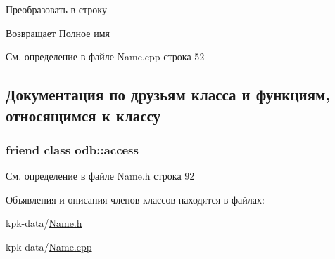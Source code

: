 Преобразовать в строку 

\begin{DoxyReturn}{Возвращает}
Полное имя 
\end{DoxyReturn}


См. определение в файле Name.\+cpp строка 52



\subsection{Документация по друзьям класса и функциям, относящимся к классу}
\subsubsection[{\texorpdfstring{odb\+::access}{odb::access}}]{\setlength{\rightskip}{0pt plus 5cm}friend class odb\+::access\hspace{0.3cm}{\ttfamily [friend]}}\hypertarget{classkpk_1_1data_1_1_name_acb4d953abf85ae525f1d06a0c3a86a55}{}\label{classkpk_1_1data_1_1_name_acb4d953abf85ae525f1d06a0c3a86a55}


См. определение в файле Name.\+h строка 92



Объявления и описания членов классов находятся в файлах\+:\begin{DoxyCompactItemize}
\item 
kpk-\/data/\hyperlink{_name_8h}{Name.\+h}\item 
kpk-\/data/\hyperlink{_name_8cpp}{Name.\+cpp}\end{DoxyCompactItemize}
